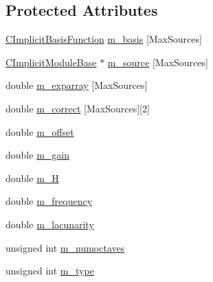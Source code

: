 \subsection*{Protected Attributes}
\begin{DoxyCompactItemize}
\item 
\hyperlink{classanl_1_1CImplicitBasisFunction}{CImplicitBasisFunction} \hyperlink{classanl_1_1CImplicitFractal_a067edf57220e5c6175c928b6f99dcdeb}{m\_\-basis} \mbox{[}MaxSources\mbox{]}
\item 
\hyperlink{classanl_1_1CImplicitModuleBase}{CImplicitModuleBase} $\ast$ \hyperlink{classanl_1_1CImplicitFractal_ad9688497eb2e4ff139d17bea34d7c5f4}{m\_\-source} \mbox{[}MaxSources\mbox{]}
\item 
double \hyperlink{classanl_1_1CImplicitFractal_afa8f9fd220306504a35811a6e4044845}{m\_\-exparray} \mbox{[}MaxSources\mbox{]}
\item 
double \hyperlink{classanl_1_1CImplicitFractal_ad488afef8f7ee67b7582450463f88a5f}{m\_\-correct} \mbox{[}MaxSources\mbox{]}\mbox{[}2\mbox{]}
\item 
double \hyperlink{classanl_1_1CImplicitFractal_ab9aecdcff819f3163dfbad2081460f45}{m\_\-offset}
\item 
double \hyperlink{classanl_1_1CImplicitFractal_abd3ef6a0ae72fab8ba335b064a07fbbe}{m\_\-gain}
\item 
double \hyperlink{classanl_1_1CImplicitFractal_a181a0101372698680c0371a9499e70c4}{m\_\-H}
\item 
double \hyperlink{classanl_1_1CImplicitFractal_a93b0895cd9978febef5ff782710b3894}{m\_\-frequency}
\item 
double \hyperlink{classanl_1_1CImplicitFractal_afeb1402f336e659bd31287bf2a46c374}{m\_\-lacunarity}
\item 
unsigned int \hyperlink{classanl_1_1CImplicitFractal_a2c445f91a2a724a5e915c585b1f5a40d}{m\_\-numoctaves}
\item 
unsigned int \hyperlink{classanl_1_1CImplicitFractal_a9cb56d55cc44609583ad2baca10e7173}{m\_\-type}
\end{DoxyCompactItemize}


